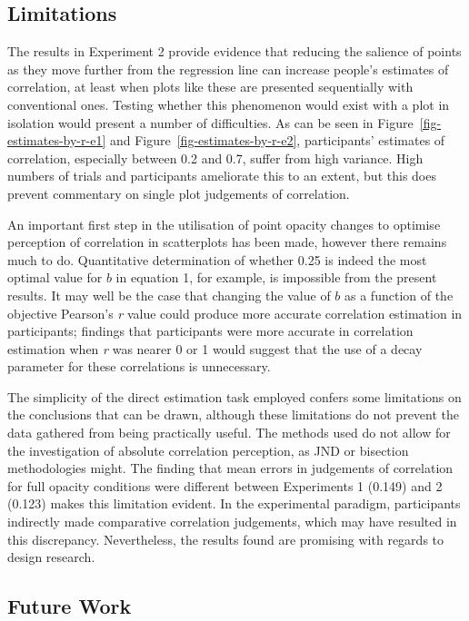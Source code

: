 \documentclass[../main.tex]{subfiles}
\begin{document}
\subsection{Limitations}\label{limitations-adjusting-opacity}

The results in Experiment 2 provide evidence that reducing the salience
of points as they move further from the regression line can increase
people's estimates of correlation, at least when plots like these are
presented sequentially with conventional ones. Testing whether this
phenomenon would exist with a plot in isolation would present a number
of difficulties. As can be seen in Figure~\ref{fig-estimates-by-r-e1}
and Figure~\ref{fig-estimates-by-r-e2}, participants' estimates of
correlation, especially between 0.2 and 0.7, suffer from high variance.
High numbers of trials and participants ameliorate this to an extent,
but this does prevent commentary on single plot judgements of
correlation.

An important first step in the utilisation of point opacity changes to
optimise perception of correlation in scatterplots has been made,
however there remains much to do. Quantitative determination of whether
0.25 is indeed the most optimal value for \(b\) in equation 1, for
example, is impossible from the present results. It may well be the case
that changing the value of \(b\) as a function of the objective
Pearson's \emph{r} value could produce more accurate correlation
estimation in participants; findings that participants were more
accurate in correlation estimation when \emph{r} was nearer 0 or 1 would
suggest that the use of a decay parameter for these correlations is
unnecessary.

The simplicity of the direct estimation task employed confers some
limitations on the conclusions that can be drawn, although these
limitations do not prevent the data gathered from being practically
useful. The methods used do not allow for the investigation of absolute
correlation perception, as JND or bisection methodologies might. The
finding that mean errors in judgements of correlation for full opacity
conditions were different between Experiments 1 (0.149) and 2 (0.123)
makes this limitation evident. In the experimental paradigm,
participants indirectly made comparative correlation judgements, which
may have resulted in this discrepancy. Nevertheless, the results found
are promising with regards to design research.

\subsection{Future Work}\label{future-work-adjusting-opacity}
\end{document}
